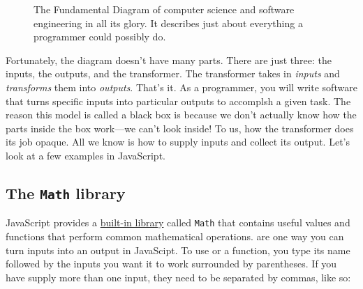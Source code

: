 \documentclass{amsart}
\makeatletter
\def\tikzscale{1}\begin{lrbox}{\measure@tikzpicture}%
\edef\tikzscale{\pgfmathresult}%
\makeatother
\begin{document}
\begin{figure}[h]
\begin{scaletikzpicturetowidth}{\textwidth}
\end{scaletikzpicturetowidth}
\caption{\label{fig:intro-fundemental-diagram} The Fundamental Diagram of computer science and software engineering in all its glory. It describes just about everything a programmer could possibly do.}
\end{figure}

Fortunately, the diagram doesn't have many parts. There are just three: the inputs, the outputs, and the transformer. The transformer takes in \emph{inputs} and \emph{transforms} them into \emph{outputs}. That's it. As a programmer, you will write software that turns specific inputs into particular outputs to accomplsh a given task. The reason this model is called a black box is because we don't actually know how the parts inside the box work---we can't look inside! To us, how the transformer does its job opaque. All we know is how to supply inputs and collect its output. Let's look at a few examples in JavaScript.

\subsection{The \texttt{Math} library}

JavaScript provides a \href{https://developer.mozilla.org/en-US/docs/Web/JavaScript/Reference/Global_Objects/Math}{built-in library} called \texttt{Math} that contains useful values and functions that perform common mathematical operations.  are one way you can turn inputs into an output in JavaScipt. To use or  a function, you type its name followed by the inputs you want it to work surrounded by parentheses. If you have supply more than one input, they need to be separated by commas, like so:
\end{document}
